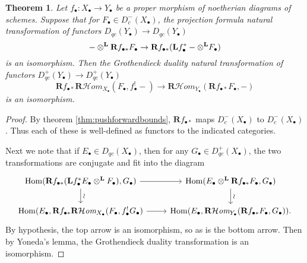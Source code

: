 \documentclass{report}
\newtheorem{theorem}{Theorem}[section]
\theoremstyle{definition}
\DeclareMathOperator{\Hom}{Hom}
\newcommand{\cHom}{\mathcal{H} \textit{om}}
\newcommand{\bL}{\textbf{L}}
\newcommand{\bR}{\textbf{R}}
\newcommand{\otimesL}{\otimes^{\bf L}}
\begin{document}
\begin{theorem}
	Let $f_\bullet : X_\bullet \rightarrow Y_\bullet$ be a proper morphism of noetherian diagrams of schemes.
	Suppose that for $F_\bullet \in D_{c}^-(X_\bullet)$, the projection formula natural transformation of functors $D_{qc}(Y_\bullet) \rightarrow D_{qc}(Y_\bullet)$
	\[
		- \otimesL \bR f_{\bullet *} F_\bullet \rightarrow \bR f_{\bullet *}(\bL f_\bullet^* - \otimesL F_\bullet)
	\]
	is an isomorphism.
	Then the Grothendieck duality natural transformation of functors $D_{qc}^+(Y_\bullet) \rightarrow D_{qc}^+(Y_\bullet)$
	\[
		\bR f_{\bullet *} \bR \cHom_{X_\bullet} (F_\bullet, f_\bullet^! -) \rightarrow \bR \cHom_{Y_\bullet} (\bR f_{\bullet *} F_\bullet, -)
	\]
	is an isomorphism.
\end{theorem}
\begin{proof}
	By theorem \ref{thm:pushforwardbounds}, $\bR f_{\bullet *}$ maps $D^-_{c}(X_\bullet)$ to $D_c^-(X_\bullet)$.
	Thus each of these is well-defined as functors to the indicated categories.
	
	Next we note that if $E_\bullet \in D_{qc}(X_\bullet)$, then for any $G_\bullet \in D_{qc}^+(X_\bullet)$, the two transformations are conjugate and fit into the diagram
	\[
	\begin{tikzcd}
		\Hom(\bR f_{\bullet *}(\bL f_\bullet^* E_\bullet \otimesL F_\bullet), G_\bullet) \arrow{d}[sloped, above]{\sim} \arrow{r} & \Hom(E_\bullet \otimesL \bR f_{\bullet *} F_\bullet, G_\bullet) \arrow{d}[sloped, above]{\sim} \\
		\Hom(E_\bullet, \bR f_{\bullet *} \bR \cHom_{X_\bullet} (F_\bullet, f_\bullet^! G_\bullet) \arrow{r} & \Hom(E_\bullet, \bR \cHom_{Y_\bullet} (\bR f_{\bullet *} F_\bullet, G_\bullet)).
	\end{tikzcd}
	\]
	By hypothesis, the top arrow is an isomorphism, so as is the bottom arrow.
	Then by Yoneda's lemma, the Grothendieck duality transformation is an isomorphism.
\end{proof}
\end{document}
